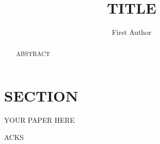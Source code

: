 \documentclass{jot}
\title{TITLE}
\author[affiliation=orgname, nowrap] %
    {First Author}
    {is ...
    Contact him at \email{EMAIL}, or visit \url{URL}.}
\affiliation{orgname}{ORGANISATION}
\begin{document}
\begin{abstract}
ABSTRACT
\end{abstract}



\section{SECTION}

YOUR PAPER HERE


\backmatter




\abouttheauthors

\begin{acknowledgments}
ACKS
\end{acknowledgments}
\end{document}

